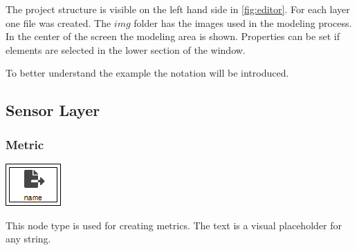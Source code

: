 The project structure is visible on the left hand side in \cref{fig:editor}. For each layer one file was created. The $img$ folder has the images used in the modeling process. In the center of the screen the modeling area is shown. Properties can be set if elements are selected in the lower section of the window.

To better understand the example the notation will be introduced.

\subsection{Sensor Layer}

\subsubsection{Metric}
\noindent\begin{minipage}{0.15\textwidth}%
	\includegraphics[width=\linewidth]{assets/images/metric}
\end{minipage}%
\hfill%
\begin{minipage}{0.8\textwidth}
	This node type is used for creating metrics. The text  is a visual placeholder for any string.
\end{minipage}


